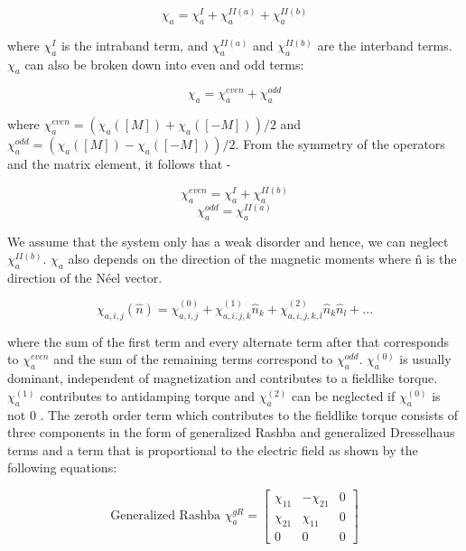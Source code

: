\documentclass[letterpaper,10pt,doublespacing,edeposit]{uiucthesis2020}
\begin{document}
\begin{mainmatter}
\begin{equation}
\chi_a = \chi_a^I + \chi_a^{II(a)} + \chi_a^{II(b)}
\end{equation}

where $\chi_a^I$ is the intraband term, and $\chi_a^{II(a)}$ and $\chi_a^{II(b)}$ are the interband terms. $\chi_a$ can also be broken down into even and odd terms:

\begin{equation}
\chi_a = \chi_a^{even} + \chi_a^{odd}
\end{equation}

where $\chi_a^{even} = (\chi_a([M])+\chi_a([-M]))/2$ and $\chi_a^{odd} = (\chi_a([M])-\chi_a([-M]))/2$. From the symmetry of the operators and the matrix element, it follows that -

\begin{equation}
\chi_a^{even} = \chi_a^{I} + \chi_a^{II(b)}
\end{equation}
\begin{equation}
\chi_a^{odd} = \chi_a^{II(a)}
\end{equation}

We assume that the system only has a weak disorder and hence, we can neglect $\chi_a^{II(b)}$. $\chi_a$ also depends on the direction of the magnetic moments where \^n is the direction of the N\'eel vector.

\begin{equation}
\chi_{a,i,j}(\hat{n}) = \chi_{a,i,j}^{(0)} + \chi_{a,i,j,k}^{(1)}\hat{n}_k + \chi_{a,i,j,k,l}^{(2)}\hat{n}_k\hat{n}_l + ...
\end{equation}

where the sum of the first term and every alternate term after that corresponds to $\chi_a^{even}$ and the sum of the remaining terms correspond to $\chi_a^{odd}$. $\chi_a^{(0)}$ is usually dominant, independent of magnetization and contributes to a fieldlike torque. $\chi_a^{(1)}$ contributes to antidamping torque and $\chi_a^{(2)}$ can be neglected if $\chi_a^{(0)}$ is not 0 \cite{Zelezny2017}. The zeroth order term which contributes to the fieldlike torque consists of three components in the form of generalized Rashba and generalized Dresselhaus terms and a term that is proportional to the electric field as shown by the following equations:

\begin{equation}
\text{Generalized Rashba } \chi_a^{gR} = \begin{bmatrix} \chi_{11} & -\chi_{21} & 0 \\ \chi_{21} & \chi_{11} & 0 \\ 0 & 0 & 0 \end{bmatrix}
\end{equation}


\end{mainmatter}
\end{document}
